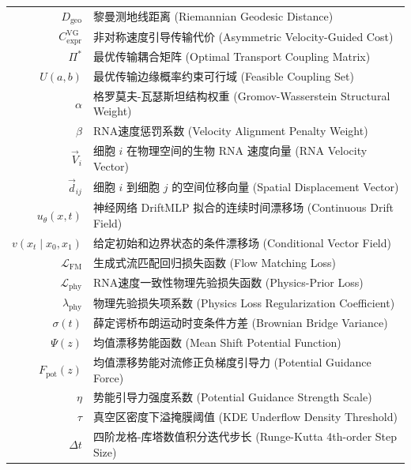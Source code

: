 
\begin{nomenclature}
\label{chap:symb}

\begin{longtable}{rl}
  $D_{\text{geo}}$ & 黎曼测地线距离 (Riemannian Geodesic Distance) \\  
  $C_{\text{expr}}^{\text{VG}}$ & 非对称速度引导传输代价 (Asymmetric Velocity-Guided Cost) \\
  $\Pi^*$ & 最优传输耦合矩阵 (Optimal Transport Coupling Matrix) \\
  $U(a, b)$ & 最优传输边缘概率约束可行域 (Feasible Coupling Set) \\
  $\alpha$ & 格罗莫夫-瓦瑟斯坦结构权重 (Gromov-Wasserstein Structural Weight) \\
  $\beta$ & RNA速度惩罚系数 (Velocity Alignment Penalty Weight) \\
  $\vec{V}_i$ & 细胞 $i$ 在物理空间的生物 RNA 速度向量 (RNA Velocity Vector) \\
  $\vec{d}_{ij}$ & 细胞 $i$ 到细胞 $j$ 的空间位移向量 (Spatial Displacement Vector) \\
  $u_\theta(x, t)$ & 神经网络 DriftMLP 拟合的连续时间漂移场 (Continuous Drift Field) \\
  $v(x_t \mid x_0, x_1)$ & 给定初始和边界状态的条件漂移场 (Conditional Vector Field) \\
  $\mathcal{L}_{\text{FM}}$ & 生成式流匹配回归损失函数 (Flow Matching Loss) \\
  $\mathcal{L}_{\text{phy}}$ & RNA速度一致性物理先验损失函数 (Physics-Prior Loss) \\
  $\lambda_{\text{phy}}$ & 物理先验损失项系数 (Physics Loss Regularization Coefficient) \\
  $\sigma(t)$ & 薛定谔桥布朗运动时变条件方差 (Brownian Bridge Variance) \\
  $\Psi(z)$ & 均值漂移势能函数 (Mean Shift Potential Function) \\
  $F_{\text{pot}}(z)$ & 均值漂移势能对流修正负梯度引导力 (Potential Guidance Force) \\
  $\eta$ & 势能引导力强度系数 (Potential Guidance Strength Scale) \\
  $\tau$ & 真空区密度下溢掩膜阈值 (KDE Underflow Density Threshold) \\
  $\Delta t$ & 四阶龙格-库塔数值积分迭代步长 (Runge-Kutta 4th-order Step Size) \\
\end{longtable}

\end{nomenclature}
